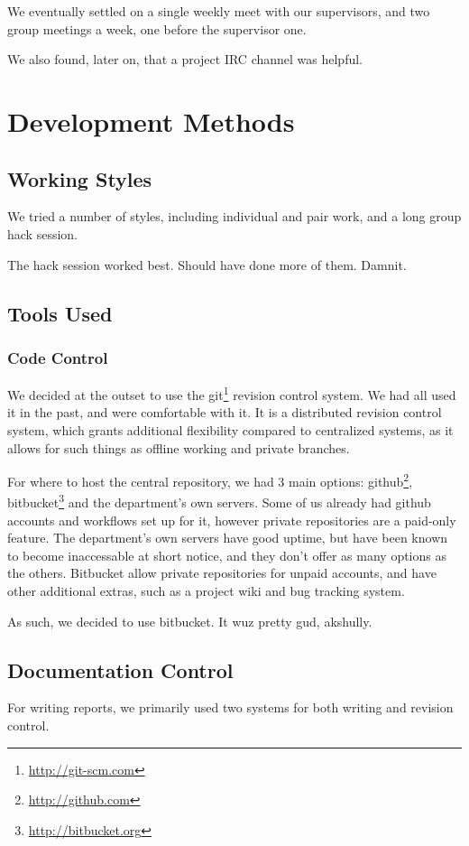     We eventually settled on a single weekly meet with our supervisors, and two group meetings a week, one before the supervisor one.

    We also found, later on, that a project IRC channel was helpful.


\section{Development Methods}

  \subsection{Working Styles}
    We tried a number of styles, including individual and pair work, and a long group hack session.

    The hack session worked best.
    Should have done more of them.
    Damnit.

  \subsection{Tools Used}
    \subsubsection{Code Control}
      We decided at the outset to use the git\footnote{\url{http://git-scm.com}} revision control system.
      We had all used it in the past, and were comfortable with it.
      It is a distributed revision control system, which grants additional flexibility compared to centralized systems, as it allows for such things as offline working and private branches.

      For where to host the central repository, we had 3 main options: github\footnote{\url{http://github.com}}, bitbucket\footnote{\url{http://bitbucket.org}} and the department's own servers.
      Some of us already had github accounts and workflows set up for it, however private repositories are a paid-only feature.
      The department's own servers have good uptime, but have been known to become inaccessable at short notice, and they don't offer as many options as the others.
      Bitbucket allow private repositories for unpaid accounts, and have other additional extras, such as a project wiki and bug tracking system.

      As such, we decided to use bitbucket.
      It wuz pretty gud, akshully.

    \subsection{Documentation Control}
      For writing reports, we primarily used two systems for both writing and revision control.


